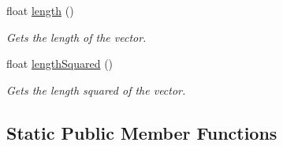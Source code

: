 \begin{DoxyCompactItemize}
float \hyperlink{classflounder_1_1vector4_ad21f01ec6397b385f7aef3335726fb25}{length} ()
\begin{DoxyCompactList}\small\item\em Gets the length of the vector. \end{DoxyCompactList}\item 
float \hyperlink{classflounder_1_1vector4_a335e6cb17910722580079ff41bf352f1}{length\+Squared} ()
\begin{DoxyCompactList}\small\item\em Gets the length squared of the vector. \end{DoxyCompactList}\end{DoxyCompactItemize}
\subsection*{Static Public Member Functions}
